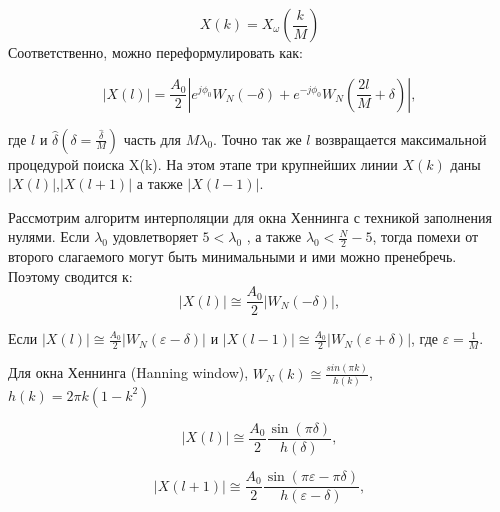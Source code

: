 \begin{equation}
	\label{eq:equation23}
	X(k)= X_\omega \left( {\frac{k}{M}}\right)  \end{equation}
Соответственно,  можно переформулировать как:

\begin{equation}
	\label{eq:equation24}
	\left| {X(l)} \right|   = \frac{A_0}{2}\left| {e^{j\phi_0}W_N(-\delta)+e^{-j\phi_0}W_N \left(\frac{2l}{M}+\delta \right)} \right|,
\end{equation}

где $l$ и $\hat{\delta}
\left( {\delta= \frac{\hat{\delta}}{M}}\right) $
часть для $M\lambda_0$. Точно так же $l$ возвращается максимальной процедурой поиска X(k). На этом этапе три крупнейших линии $X(k)$ даны $\left| {X(l)} \right|$,$\left| {X(l+1)} \right|$ а также $\left|{X(l-1)}\right|$.

Рассмотрим алгоритм интерполяции для окна Хеннинга с техникой заполнения нулями.
Если $\lambda_0$ удовлетворяет $5<\lambda_0$ , а также $\lambda_0 < \frac{N}{2}-5$, тогда помехи от второго слагаемого могут быть минимальными и ими можно пренебречь. Поэтому  сводится к:
\begin{equation}
	\label{eq:equation25}
	\left| {X(l)} \right| \cong \frac{A_0}{2}\left| {W_N(-\delta)} \right|,
\end{equation}

Если $\left| {X(l)} \right| \cong \frac{A_0}{2}\left| {W_N(\varepsilon -\delta)} \right|$ и $\left| {X(l-1)} \right| \cong \frac{A_0}{2} \left| {W_N(\varepsilon +\delta)} \right|$, где $\varepsilon=\frac{1}{M}$. 

Для окна Хеннинга (Hanning window), $W_N (k) \cong \frac{sin(\pi k)}{h(k)}$,
$h(k) = 2 \pi k (1-k^2)$ \cite{xie1996nonlinear}

\begin{equation}
	\label{eq:equation26}
	\left| {X(l)} \right| \cong \frac{A_0}{2} \frac{\sin{(\pi \delta)} }{h(\delta)} ,
\end{equation}

\begin{equation}
	\label{eq:equation27}
	\left| {X(l+1)} \right| \cong \frac{A_0}{2} \frac{\sin{(\pi \varepsilon - \pi \delta)} }{h(\varepsilon - \delta)} ,
\end{equation}

